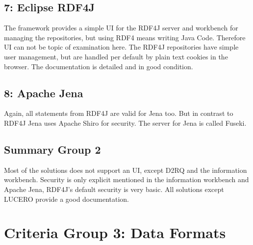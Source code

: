 \subsection*{7: Eclipse RDF4J}
The framework provides a simple UI for the RDF4J server and workbench for managing the repositories, but using RDF4 means writing Java Code. Therefore UI can not be topic of examination here. The RDF4J repositories have simple user management, but are handled per default by plain text cookies in the browser. The documentation is detailed and in good condition.

\subsection*{8: Apache Jena}
Again, all statements from RDF4J are valid for Jena too. But in contrast to RDF4J Jena uses Apache Shiro for security. The server for Jena is called Fuseki.

\subsection{Summary Group 2}
Most of the solutions does not support an UI, except D2RQ and the information workbench. Security is only explicit mentioned in the information workbench and Apache Jena, RDF4J's default security is very basic. All solutions except LUCERO provide a good documentation.

\section{Criteria Group 3: Data Formats}

